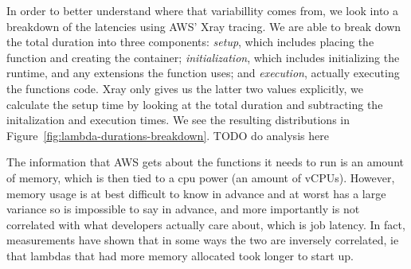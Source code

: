 In order to better understand where that variabillity comes from, we look into a
breakdown of the latencies using AWS' Xray tracing. 
We are able to break down the total duration into three components:
\textit{setup}, which includes placing the function and creating the container;
\textit{initialization}, which includes initializing the runtime, and any
extensions the function uses; and \textit{execution}, actually executing the
functions code. Xray only gives us the latter two values explicitly, we
calculate the setup time by looking at the total duration and subtracting the
initalization and execution times. We see the resulting distributions in
Figure~\ref{fig:lambda-durations-breakdown}. TODO do analysis here



The information that AWS gets about the functions it needs to run is an amount
of memory, which is then tied to a cpu power (an amount of vCPUs). However,
memory usage is at best difficult to know in advance and at worst has a large
variance so is impossible to say in advance, and more importantly is not
correlated with what developers actually care about, which is job latency. In
fact, measurements have shown that in some ways the two are inversely
correlated, ie that lambdas that had more memory allocated took longer to start
up. 

